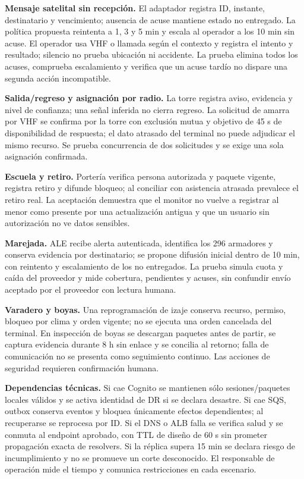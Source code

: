 \documentclass[11pt,letterpaper]{report}
\begin{document}
\textbf{Mensaje satelital sin recepción.} El adaptador registra ID, instante, destinatario y vencimiento; ausencia de acuse mantiene estado no entregado. La política propuesta reintenta a 1, 3 y 5 min y escala al operador a los 10 min sin acuse. El operador usa VHF o llamada según el contexto y registra el intento y resultado; silencio no prueba ubicación ni accidente. La prueba elimina todos los acuses, comprueba escalamiento y verifica que un acuse tardío no dispare una segunda acción incompatible.

\textbf{Salida/regreso y asignación por radio.} La torre registra aviso, evidencia y nivel de confianza; una señal inferida no cierra regreso. La solicitud de amarra por VHF se confirma por la torre con exclusión mutua y objetivo de 45 s de disponibilidad de respuesta; el dato atrasado del terminal no puede adjudicar el mismo recurso. Se prueba concurrencia de dos solicitudes y se exige una sola asignación confirmada.

\textbf{Escuela y retiro.} Portería verifica persona autorizada y paquete vigente, registra retiro y difunde bloqueo; al conciliar con asistencia atrasada prevalece el retiro real. La aceptación demuestra que el monitor no vuelve a registrar al menor como presente por una actualización antigua y que un usuario sin autorización no ve datos sensibles.

\textbf{Marejada.} ALE recibe alerta autenticada, identifica los 296 armadores y conserva evidencia por destinatario; se propone difusión inicial dentro de 10 min, con reintento y escalamiento de los no entregados. La prueba simula cuota y caída del proveedor y mide cobertura, pendientes y acuses, sin confundir envío aceptado por el proveedor con lectura humana.

\textbf{Varadero y boyas.} Una reprogramación de izaje conserva recurso, permiso, bloqueo por clima y orden vigente; no se ejecuta una orden cancelada del terminal. En inspección de boyas se descargan paquetes antes de partir, se captura evidencia durante 8 h sin enlace y se concilia al retorno; falla de comunicación no se presenta como seguimiento continuo. Las acciones de seguridad requieren confirmación humana.

\textbf{Dependencias técnicas.} Si cae Cognito se mantienen sólo sesiones/paquetes locales válidos y se activa identidad de DR si se declara desastre. Si cae SQS, outbox conserva eventos y bloquea únicamente efectos dependientes; al recuperarse se reprocesa por ID. Si el DNS o ALB falla se verifica salud y se conmuta al endpoint aprobado, con TTL de diseño de 60 s sin prometer propagación exacta de resolvers. Si la réplica supera 15 min se declara riesgo de incumplimiento y no se promueve un corte desconocido. El responsable de operación mide el tiempo y comunica restricciones en cada escenario.
\end{document}
